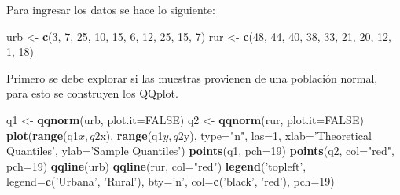 \documentclass[10pt,]{krantz}
\makeatletter
\newenvironment{Shaded}{\begin{snugshade}}{\end{snugshade}}
\newcommand{\KeywordTok}[1]{\textcolor[rgb]{0.13,0.29,0.53}{\textbf{{#1}}}}
\newcommand{\DataTypeTok}[1]{\textcolor[rgb]{0.13,0.29,0.53}{{#1}}}
\newcommand{\DecValTok}[1]{\textcolor[rgb]{0.00,0.00,0.81}{{#1}}}
\newcommand{\StringTok}[1]{\textcolor[rgb]{0.31,0.60,0.02}{{#1}}}
\newcommand{\OtherTok}[1]{\textcolor[rgb]{0.56,0.35,0.01}{{#1}}}
\newcommand{\NormalTok}[1]{{#1}}
\newenvironment{kframe}{%
\medskip{}
\setlength{\fboxsep}{.8em}
 \def\at@end@of@kframe{}%
 \ifinner\ifhmode%
  \def\at@end@of@kframe{\end{minipage}}%
  \begin{minipage}{\columnwidth}%
 \fi\fi%
 \def\FrameCommand##1{\hskip\@totalleftmargin \hskip-\fboxsep
 \colorbox{shadecolor}{##1}\hskip-\fboxsep
     \hskip-\linewidth \hskip-\@totalleftmargin \hskip\columnwidth}%
 \MakeFramed {\advance\hsize-\width
   \@totalleftmargin\z@ \linewidth\hsize
   \@setminipage}}%
 {\par\unskip\endMakeFramed%
 \at@end@of@kframe}
\renewenvironment{Shaded}{\begin{kframe}}{\end{kframe}}
\makeatother
\begin{document}
Para ingresar los datos se hace lo siguiente:

\begin{Shaded}
\begin{Highlighting}[]
\NormalTok{urb <-}\StringTok{ }\KeywordTok{c}\NormalTok{(}\DecValTok{3}\NormalTok{, }\DecValTok{7}\NormalTok{, }\DecValTok{25}\NormalTok{, }\DecValTok{10}\NormalTok{, }\DecValTok{15}\NormalTok{, }\DecValTok{6}\NormalTok{, }\DecValTok{12}\NormalTok{, }\DecValTok{25}\NormalTok{, }\DecValTok{15}\NormalTok{, }\DecValTok{7}\NormalTok{)}
\NormalTok{rur <-}\StringTok{ }\KeywordTok{c}\NormalTok{(}\DecValTok{48}\NormalTok{, }\DecValTok{44}\NormalTok{, }\DecValTok{40}\NormalTok{, }\DecValTok{38}\NormalTok{, }\DecValTok{33}\NormalTok{, }\DecValTok{21}\NormalTok{, }\DecValTok{20}\NormalTok{, }\DecValTok{12}\NormalTok{, }\DecValTok{1}\NormalTok{, }\DecValTok{18}\NormalTok{)}
\end{Highlighting}
\end{Shaded}

Primero se debe explorar si las muestras provienen de una población
normal, para esto se construyen los QQplot.

\begin{Shaded}
\begin{Highlighting}[]
\NormalTok{q1 <-}\StringTok{ }\KeywordTok{qqnorm}\NormalTok{(urb, }\DataTypeTok{plot.it=}\OtherTok{FALSE}\NormalTok{)}
\NormalTok{q2 <-}\StringTok{ }\KeywordTok{qqnorm}\NormalTok{(rur, }\DataTypeTok{plot.it=}\OtherTok{FALSE}\NormalTok{)}
\KeywordTok{plot}\NormalTok{(}\KeywordTok{range}\NormalTok{(q1$x, q2$x), }\KeywordTok{range}\NormalTok{(q1$y, q2$y), }\DataTypeTok{type=}\StringTok{"n"}\NormalTok{, }\DataTypeTok{las=}\DecValTok{1}\NormalTok{,}
     \DataTypeTok{xlab=}\StringTok{'Theoretical Quantiles'}\NormalTok{, }\DataTypeTok{ylab=}\StringTok{'Sample Quantiles'}\NormalTok{)}
\KeywordTok{points}\NormalTok{(q1, }\DataTypeTok{pch=}\DecValTok{19}\NormalTok{)}
\KeywordTok{points}\NormalTok{(q2, }\DataTypeTok{col=}\StringTok{"red"}\NormalTok{, }\DataTypeTok{pch=}\DecValTok{19}\NormalTok{)}
\KeywordTok{qqline}\NormalTok{(urb)}
\KeywordTok{qqline}\NormalTok{(rur, }\DataTypeTok{col=}\StringTok{"red"}\NormalTok{)}
\KeywordTok{legend}\NormalTok{(}\StringTok{'topleft'}\NormalTok{, }\DataTypeTok{legend=}\KeywordTok{c}\NormalTok{(}\StringTok{'Urbana'}\NormalTok{, }\StringTok{'Rural'}\NormalTok{), }\DataTypeTok{bty=}\StringTok{'n'}\NormalTok{,}
       \DataTypeTok{col=}\KeywordTok{c}\NormalTok{(}\StringTok{'black'}\NormalTok{, }\StringTok{'red'}\NormalTok{), }\DataTypeTok{pch=}\DecValTok{19}\NormalTok{)}
\end{Highlighting}
\end{Shaded}
\end{document}
